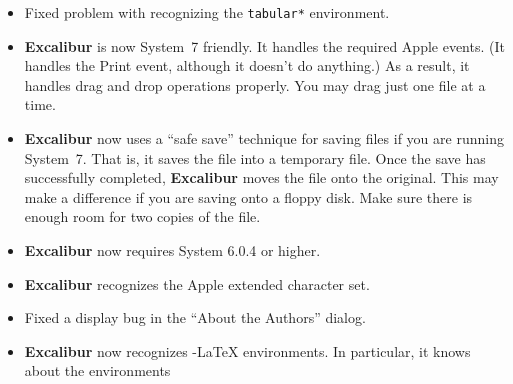 ﻿\documentclass[11pt,titlepage]{article}
\newcommand{\ex}{\textbf{Excalibur}}
\newcommand{\AmS}{\latex{{\protect\the\textfont2
        A\kern-.1667em\lower.5ex\hbox{M}\kern-.125emS}}\html{AMS}}
\begin{document}
\begin{itemize}

\item Fixed problem with recognizing the \texttt{tabular*}
  environment.

\item \ex{} is now System~7 friendly. It handles the required Apple
  events. (It handles the Print event, although it doesn't do
  anything.) As a result, it handles drag and drop operations
  properly. You may drag just one file at a time.

\item \ex{} now uses a ``safe save'' technique for saving files if you
  are running System~7. That is, it saves the file into a temporary
  file. Once the save has successfully completed, \ex{} moves the file
  onto the original.  This may make a difference if you are saving
  onto a floppy disk.  Make sure there is enough room for two copies
  of the file.

\item \ex{} now requires System 6.0.4 or higher.

\item \ex{} recognizes the Apple extended character set.

\item Fixed a display bug in the ``About the Authors'' dialog.

\item \ex{} now recognizes \AmS-\LaTeX{} environments. In particular,
  it knows about the environments



\end{itemize}
\end{document}
